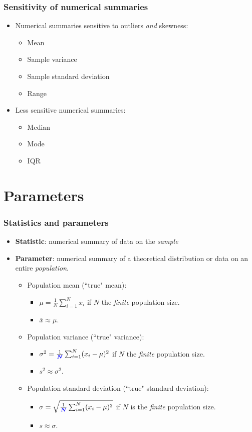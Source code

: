 \documentclass{beamer}\usepackage{graphicx, color}
\providecommand{\ov}[1]{\overline{#1}}
\providecommand{\vc}[1]{\boldsymbol{#1}}
\numberwithin{equation}{section}
\begin{document}
\begin{frame}
\frametitle{Sensitivity of numerical summaries}
\begin{itemize}
\item Numerical summaries sensitive to outliers \emph{and} skewness:
\begin{itemize}
\item Mean
\item Sample variance
\item Sample standard deviation
\item Range
\end{itemize}
\item Less sensitive numerical summaries:
\begin{itemize}
\item Median
\item Mode
\item IQR
\end{itemize}
\end{itemize}
\end{frame}


\section{Parameters}

\begin{frame}
\frametitle{Statistics and parameters}
\begin{itemize}
\item {\bf Statistic}: numerical summary of data on the \emph{sample}
\pause \item {\bf Parameter}: numerical summary of a theoretical distribution or data on an entire \emph{population}. 
\begin{itemize}
\pause \item Population mean (``true" mean):
\begin{itemize}
\pause \item $\mu = \frac{1}{N} \sum_{i = 1}^N x_i$ if $N$ the \emph{finite} population size.
\pause \item $\ov{x} \approx \mu$.
\end{itemize}
\pause \item Population variance (``true" variance):
\begin{itemize}
\pause \item $\sigma^2 = \frac{1}{\color{blue} \vc N} \sum_{i = 1}^N (x_i - \mu)^2$ if $N$ the \emph{finite} population size.
\pause \item $s^2 \approx \sigma^2$.
\end{itemize}
\pause \item Population standard deviation (``true" standard deviation):
\begin{itemize}
\pause \item $\sigma = \sqrt{ \frac{1}{\color{blue} \vc N} \sum_{i = 1}^N (x_i - \mu)^2}$ if $N$ is the \emph{finite} population size.
\pause \item $s \approx \sigma$.
\end{itemize}
\end{itemize}
\end{itemize}
\end{frame}



\end{document}
